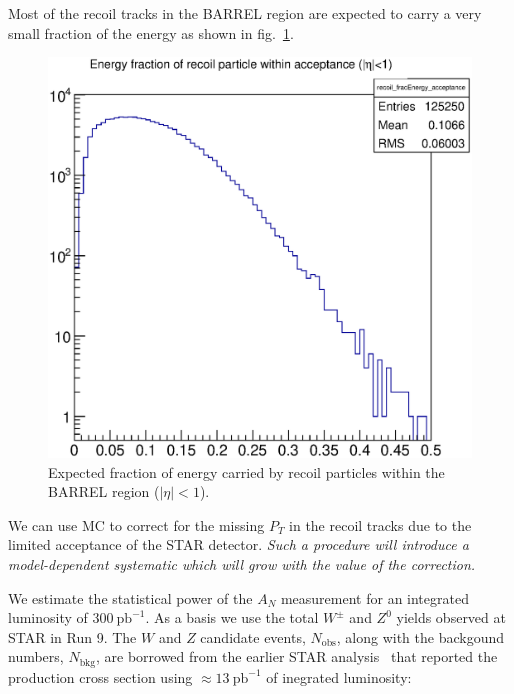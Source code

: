 \documentclass[12pt]{article}
\begin{document}
Most of the recoil tracks in the BARREL region are expected to carry a very
small fraction of the energy as shown in fig.~\ref{fig:MC_recoil_Efrac}.

\begin{figure}
\centering
\includegraphics[height=0.5\textheight]{images/recoil_energy_frac.eps}
\caption{Expected fraction of energy carried by recoil particles within the BARREL region ($|\eta|<1$).}
\label{fig:MC_recoil_Efrac} 
\end{figure}

We can use MC to correct for the missing $P_{T}$ in the recoil tracks due to
the limited acceptance of the STAR detector. \textit{Such a procedure will
introduce a model-dependent systematic which will grow with the value of the
correction.}

We estimate the statistical power of the $A_N$ measurement for an integrated
luminosity of $300~\text{pb}^{-1}$. As a basis we use the total $W^\pm$ and
$Z^0$ yields observed at STAR in Run 9. The $W$ and $Z$ candidate events,
$N_\text{obs}$, along with the backgound numbers, $N_\text{bkg}$, are borrowed
from the earlier STAR analysis~\cite{WCrossSecRun9} that reported the production
cross section using $\approx 13~\text{pb}^{-1}$ of inegrated luminosity:
%
\end{document}
